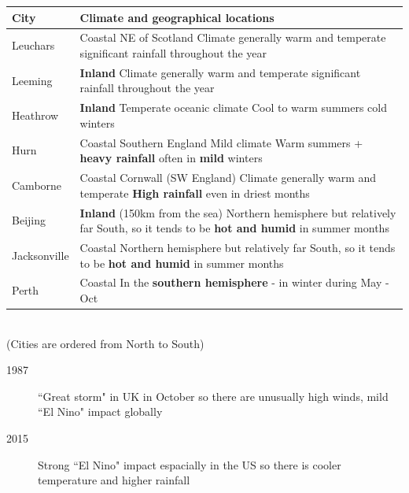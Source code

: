 \documentclass[oneside,fleqn,11pt]{book}
\begin{document}
	\begin{tabular}{|p{2cm}|p{15cm}|}
		\hline
		\textbf{City} & \textbf{Climate and geographical locations} \\
		\hline
		Leuchars & Coastal \newline NE of Scotland \newline Climate generally warm and temperate \newline significant rainfall throughout the year\\
		\hline
		Leeming & \textbf{Inland} \newline Climate generally warm and temperate \newline significant rainfall throughout the year\\
		\hline
		Heathrow  & \textbf{Inland} \newline Temperate oceanic climate \newline Cool to warm summers \newline cold winters\\
		\hline
		Hurn  & Coastal \newline Southern England \newline Mild climate \newline Warm summers + \textbf{heavy rainfall} often in \textbf{mild} winters\\
		\hline
		Camborne & Coastal \newline Cornwall (SW England) \newline Climate generally warm and temperate \newline \textbf{High rainfall} even in driest months\\
		\hline
		Beijing  & \textbf{Inland} (150km from the sea) \newline Northern hemisphere but relatively far South, so it tends to be \textbf{hot and humid} in summer months\\
		\hline
		Jacksonville  & Coastal \newline Northern hemisphere but relatively far South, so it tends to be \textbf{hot and humid} in summer months \\
		\hline
		Perth & Coastal \newline In the \textbf{southern hemisphere} - in winter during May - Oct\\
		\hline
	\end{tabular}\\
	(Cities are ordered from North to South)
	
	\begin{description}
		\item[1987] ``Great storm" in UK in October so there are unusually high winds, mild ``El Nino" impact globally
		\item[2015] Strong ``El Nino" impact espacially in the US so there is cooler temperature and higher rainfall
	\end{description}
	
\end{document}
